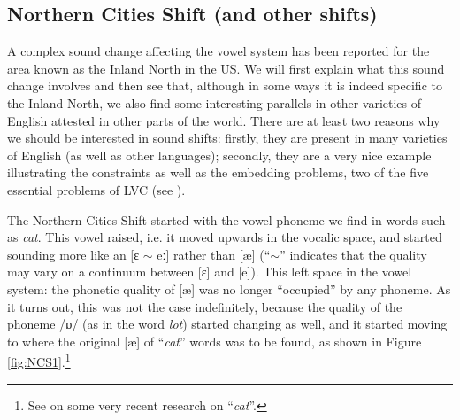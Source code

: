 \subsection{Northern Cities Shift (and other shifts)}\label{NC-shifts}
A complex sound change affecting the vowel system has been reported for the area known as the Inland North in the US. We will first explain what this sound change involves and then see that, although in some ways it is indeed specific to the Inland North, we also find some interesting parallels in other varieties of English attested in other parts of the world. There are at least two reasons why we should be interested in sound shifts: firstly, they are present in many varieties of English (as well as other languages); secondly, they are a very nice example illustrating the constraints as well as the embedding problems, two of the five essential problems of LVC (see ).

The Northern Cities Shift started with the vowel phoneme we find in words such as \emph{cat}. This vowel raised, i.e. it moved upwards in the vocalic space, and started sounding more like an [ɛ $\sim$ eː] rather than [æ] (``$\sim$'' indicates that the quality may vary on a continuum between [ɛ] and [e]). This left space in the vowel system: the phonetic quality of [æ] was no longer ``occupied'' by any phoneme. As it turns out, this was not the case indefinitely, because the quality of the phoneme /ɒ/ (as in the word \emph{lot}) started changing as well, and it started moving to where the original [æ] of ``\textit{cat}'' words was to be found, as shown in Figure \ref{fig:NCS1}.\footnote{See \citet{Nesbitt2018} on some very recent research on ``\textit{cat}''.}

\begin{figure}[H]
\end{figure}

